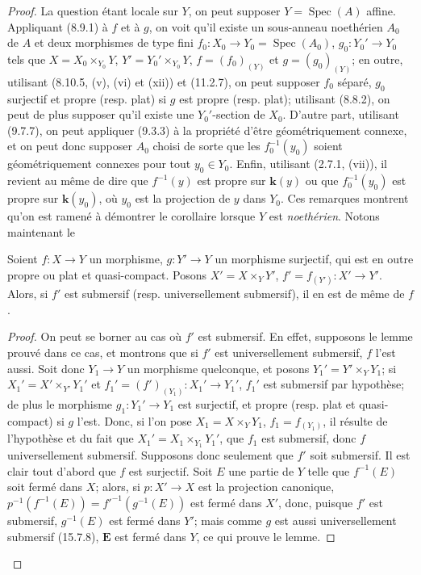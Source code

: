 \begin{proof}
La question étant locale sur $Y$, on peut supposer $Y=\operatorname{Spec}(A)$ affine. Appliquant (8.9.1) à $f$ et à $g$, on voit qu'il existe un sous-anneau noethérien $A_0$ de $A$ et deux morphismes de type fini $f_0:X_0\to Y_0=\operatorname{Spec}(A_0)$, $g_0:Y_0'\to Y_0$ tels que $X=X_0\times_{Y_0}Y$, $Y'=Y_0'\times_{Y_0}Y$, $f=(f_0)_{(Y)}$ et $g=(g_0)_{(Y)}$; en outre, utilisant (8.10.5, (v), (vi) et (xii)) et (11.2.7), on peut supposer $f_0$ séparé, $g_0$ surjectif et propre (resp. plat) si $g$ est propre (resp. plat); utilisant (8.8.2), on peut de plus supposer qu'il existe une $Y_0'$-section de $X_0$. D'autre part, utilisant (9.7.7), on peut appliquer (9.3.3) à la propriété d'être géométriquement connexe, et on peut donc supposer $A_0$ choisi de sorte que les $f_0^{-1}(y_0)$ soient géométriquement connexes pour tout $y_0\in Y_0$. Enfin, utilisant (2.7.1, (vii)), il revient au même de dire que $f^{-1}(y)$ est propre sur $\boldsymbol{k}(y)$ ou que $f_0^{-1}(y_0)$ est propre sur $\boldsymbol{k}(y_0)$, où $y_0$ est la projection de $y$ dans $Y_0$. Ces remarques montrent qu'on est ramené à démontrer le corollaire lorsque $Y$ est \emph{noethérien}. Notons maintenant le

\begin{lemma}[15.7.11.1]
\label{IV.15.7.11.1-fr}
Soient $f:X\to Y$ un morphisme, $g:Y'\to Y$ un morphisme surjectif, qui est en outre propre \textup{ou} plat et quasi-compact. Posons $X'=X\times_Y Y'$, $f'=f_{(Y')}:X'\to Y'$. Alors, si $f'$ est submersif \textup{(resp.} universellement submersif\textup{)}, il en est de même de $f$.
\end{lemma}

\begin{proof}
On peut se borner au cas où $f'$ est submersif. En effet, supposons le lemme prouvé dans ce cas, et montrons que si $f'$ est universellement submersif, $f$ l'est aussi. Soit donc $Y_1\to Y$ un morphisme quelconque, et posons $Y_1'=Y'\times_Y Y_1$; si $X_1'=X'\times_{Y'}Y_1'$ et $f_1'=(f')_{(Y_1)}:X_1'\to Y_1'$, $f_1'$ est submersif par hypothèse; de plus le morphisme $g_1:Y_1'\to Y_1$ est surjectif, et propre (resp. plat et quasi-compact) si $g$ l'est. Donc, si l'on pose $X_1=X\times_Y Y_1$, $f_1=f_{(Y_1)}$, il résulte de l'hypothèse et du fait que $X_1'=X_1\times_{Y_1}Y_1'$, que $f_1$ est submersif, donc $f$ universellement submersif. Supposons donc seulement que $f'$ soit submersif. Il est clair tout d'abord que $f$ est surjectif. Soit $E$ une partie de $Y$ telle que $f^{-1}(E)$ soit fermé dans $X$; alors, si $p:X'\to X$ est la projection canonique,
$p^{-1}(f^{-1}(E))=f'^{-1}(g^{-1}(E))$ est fermé dans $X'$, donc, puisque $f'$ est submersif, $g^{-1}(E)$ est fermé dans $Y'$; mais comme $g$ est aussi universellement submersif (15.7.8), $\mathbf{E}$ est fermé dans $Y$, ce qui prouve le lemme.
\end{proof}


\end{proof}
